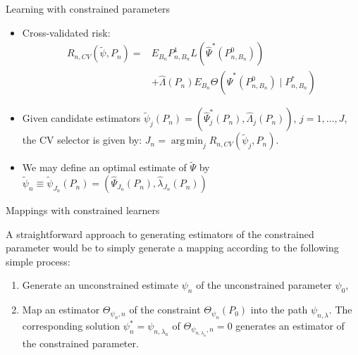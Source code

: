 \documentclass[12pt,t]{beamer}
\DeclareMathOperator*{\argmin}{arg\,min}
\begin{document}

\begin{frame}[c]{Learning with constrained parameters}

\begin{center}
\begin{itemize}
  \itemsep14pt
  \item Cross-validated risk:
    \begin{align}
      R_{n, CV}(\tilde{\psi}, P_n) =& E_{B_n}P_{n, B_n}^1L(\hat{\Psi}^*(P_{n,
        B_n}^0)) \\ &+ \hat{\Lambda}(P_n) E_{B_n} \Theta(\hat{\Psi}^*(P_{n,
        B_n}^0) \mid P_{n, B_n}^*)
    \end{align}
  \item Given candidate estimators $\widetilde{\psi}_j(P_n) =
    (\hat{\Psi}_j^*(P_n), \hat{\Lambda}_j(P_n))$, $j = 1, \ldots, J$, the CV
    selector is given by: $J_n = \argmin_j R_{n, CV}(\widetilde{\psi}_j, P_n)$.
  \item We may define an optimal estimate of $\widetilde{\Psi}$ by
    $\widetilde{\psi}_n \equiv \widetilde{\psi}_{J_n}(P_n) =
    (\hat{\Psi}_{J_n}(P_n), \hat{\lambda}_{J_n}(P_n))$
\end{itemize}
\end{center}

\note{
}

\end{frame}


\begin{frame}[c]{Mappings with constrained learners}

\begin{center}
A straightforward approach to generating estimators of the constrained parameter
would be to simply generate a mapping according to the following simple process:

\vspace*{1em}

\begin{enumerate}
  \itemsep12pt
  \item Generate an unconstrained estimate $\psi_n$ of the unconstrained
    parameter $\psi_0$,
  \item Map an estimator $\Theta_{\psi_n, n}$ of the constraint
    $\Theta_{\psi_n}(P_0)$ into the path $\psi_{n, \lambda}$. The corresponding
    solution $\psi_n^* = \psi_{n, \lambda_n}$ of $\Theta_{\psi_{n, \lambda_n},
      n} = 0$ generates an estimator of the constrained parameter.
\end{enumerate}
\end{center}

\note{
}

\end{frame}
\end{document}
